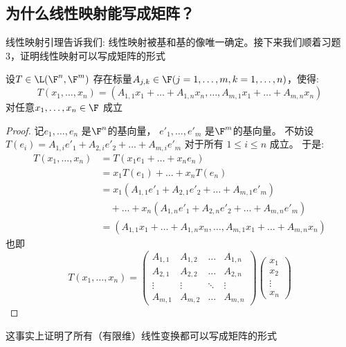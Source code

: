 \subsection{为什么线性映射能写成矩阵？}
线性映射引理告诉我们: 线性映射被基和基的像唯一确定。接下来我们顺着习题3，证明线性映射可以写成矩阵的形式
\begin{theorem}
    设\(T \in \L(\F^{n},\F^{m})\)
    存在标量\(A_{j,k} \in
    \F (j = 1, \dots ,m, k=1, \dots, n) \)，使得:
    \[
        T(x_{1},\dots,x_{n})=(A_{1,1}x_{1}+\dots+A_{1,n}x_{n},\dots,A_{m,1}x_{1}+\dots+A_{m,n}x_{n})
    \]
    对任意\(x_{1},\dots,x_{n} \in \F\) 成立
\end{theorem}

\begin{proof}
    记\(e_{1}, \dots, e_{n}\) 是\(\F^{n}\)的基向量，
    \(e'_{1}, \dots, e'_{m}\)
    是\(\F^{m}\)的基向量。
    不妨设 \(T(e_{i}) = A_{1,i}e'_{1} +
        A_{2,i}e'_{2} + \dots +
    A_{m,i}e'_{m}\) 对于所有 \(1\leq i\leq n\) 成立。
    于是:
    \begin{align*}
        T(x_{1},\dots,x_{n}) &= T(x_{1}e_{1} + \dots +
        x_{n}e_{n})\\
        &= x_{1}T(e_{1}) + \dots + x_{n}T(e_{n})\\
        &= x_{1}(A_{1,1}e'_{1} + A_{2,1}e'_{2} +
        \dots + A_{m,1}e'_{m}) \nonumber \\
        &\quad + \dots +
        x_{n}(A_{1,n}e'_{1} + A_{2,n}e'_{2} +
        \dots + A_{m,n}e'_{m})\\    &=
        (A_{1,1}x_{1}+\dots+A_{1,n}x_{n},\dots,A_{m,1}x_{1}+\dots+A_{m,n}x_{n})
    \end{align*}
    也即\[
        T(x_1, \dots, x_n) =
        \begin{pmatrix}
            A_{1,1} & A_{1,2} & \dots & A_{1,n} \\
            A_{2,1} & A_{2,2} & \dots & A_{2,n} \\
            \vdots  & \vdots  & \ddots & \vdots  \\
            A_{m,1} & A_{m,2} & \dots & A_{m,n}
        \end{pmatrix}
        \begin{pmatrix}
            x_1 \\
            x_2 \\
            \vdots \\
            x_n
        \end{pmatrix}
    \]
\end{proof}
这事实上证明了所有（有限维）线性变换都可以写成矩阵的形式

